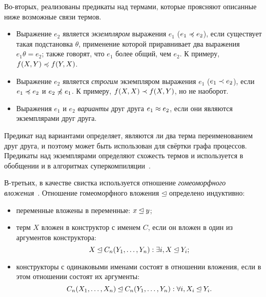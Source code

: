 
Во-вторых, реализованы предикаты над термами, которые проясняют описанные ниже возможные связи термов.
\begin{itemize}
\item Выражение $e_2$ является \emph{экземпляром} выражения $e_1$ ($e_1 \preccurlyeq e_2$),
если существует такая подстановка $\theta$, применение которой приравнивает
два выражения $e_1 \theta = e_2$; также говорят, что $e_1$ более общий, чем $e_2$.
К примеру, $f(X, Y) \preccurlyeq f(Y, X)$. %
\item Выражение $e_2$ является \emph{строгим} экземпляром выражения $e_1$ ($e_1 \prec e_2$), если
$e_1 \preccurlyeq e_2$ и $e_2 \not\preccurlyeq e_1$. К примеру, $f(X, X) \prec f(X, Y)$, но не наоборот.
\item Выражения $e_1$ и $e_2$ \emph{варианты} друг друга $e_1\approx e_2$, если они являются экземплярами друг друга.
\end{itemize}

Предикат над вариантами определяет, являются ли два терма переименованием друг друга,
и поэтому может быть использован для свёртки графа процессов. Предикаты над экземплярами определяют
схожесть термов и используется в обобщении и в алгоритмах суперкомпиляции~\cite{scPos}.


В-третьих, в качестве свистка используется отношение \emph{гомеоморфного вложения}~\cite{scGen}.
Отношение гомеоморфного вложения $\unlhd$ определено индуктивно:
\begin{itemize}
\item переменные вложены в переменные: $x \unlhd y$;
\item терм $X$ вложен в конструктор с именем $C$, если он вложен в один из аргументов конструктора:
      $$X \unlhd C_n(Y_1, \dots, Y_n): \exists i, X \unlhd Y_i;$$
\item конструкторы с одинаковыми именами состоят в отношении вложения, если в этом отношении
      состоят их аргументы:
      $$C_n(X_1, \dots, X_n) \unlhd C_n(Y_1, \dots, Y_n): \forall i, X_i \unlhd Y_i.$$
\end{itemize}

